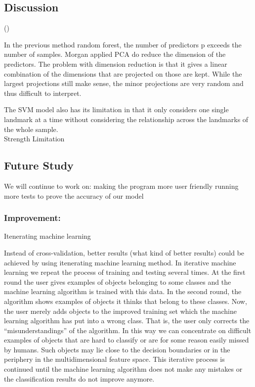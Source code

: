 \documentclass[10pt,letterpaper]{article}
\begin{document}
\subsection{Discussion}\label{discussion}

()

In the previous method random forest, the number of predictors p exceeds
the number of samples. Morgan applied PCA do reduce the dimension of the
predictors. The problem with dimension reduction is that it gives a
linear combination of the dimensions that are projected on those are
kept. While the largest projections still make sense, the minor
projections are very random and thus difficult to interpret.

The SVM model also has its limitation in that it only considers one
single landmark at a time without considering the relationship across
the landmarks of the whole sample.\\
Strength Limitation

\subsection{Future Study}\label{future-study}

We will continue to work on: making the program more user friendly
running more tests to prove the accuracy of our model

\subsubsection{Improvement:}\label{improvement}

Itenerating machine learning

Instead of cross-validation, better results (what kind of better
results) could be achieved by using itenerating machine learning method.
In iterative machine learning we repeat the process of training and
testing several times. At the first round the user gives examples of
objects belonging to some classes and the machine learning algorithm is
trained with this data. In the second round, the algorithm shows
examples of objects it thinks that belong to these classes. Now, the
user merely adds objects to the improved training set which the machine
learning algorithm has put into a wrong class. That is, the user only
corrects the ``misunderstandings'' of the algorithm. In this way we can
concentrate on difficult examples of objects that are hard to classify
or are for some reason easily missed by humans. Such objects may lie
close to the decision boundaries or in the periphery in the
multidimensional feature space. This iterative process is continued
until the machine learning algorithm does not make any mistakes or the
classification results do not improve anymore.
\end{document}
